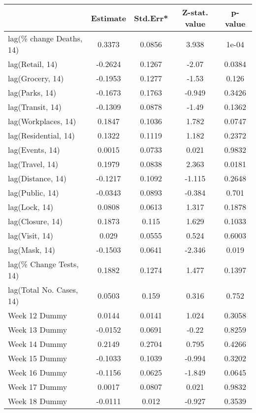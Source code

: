 \begingroup\tiny
\begin{longtable}{lcccc}
  \toprule
 & Estimate & Std.Err* & Z-stat. value & p-value \\ 
  \midrule
lag(\% change Deaths, 14) & 0.3373 & 0.0856 & 3.938 & 1e-04 \\ 
  lag(Retail, 14) & -0.2624 & 0.1267 & -2.07 & 0.0384 \\ 
  lag(Grocery, 14) & -0.1953 & 0.1277 & -1.53 & 0.126 \\ 
  lag(Parks, 14) & -0.1673 & 0.1763 & -0.949 & 0.3426 \\ 
  lag(Transit, 14) & -0.1309 & 0.0878 & -1.49 & 0.1362 \\ 
  lag(Workplaces, 14) & 0.1847 & 0.1036 & 1.782 & 0.0747 \\ 
  lag(Residential, 14) & 0.1322 & 0.1119 & 1.182 & 0.2372 \\ 
  lag(Events, 14) & 0.0015 & 0.0733 & 0.021 & 0.9832 \\ 
  lag(Travel, 14) & 0.1979 & 0.0838 & 2.363 & 0.0181 \\ 
  lag(Distance, 14) & -0.1217 & 0.1092 & -1.115 & 0.2648 \\ 
  lag(Public, 14) & -0.0343 & 0.0893 & -0.384 & 0.701 \\ 
  lag(Lock, 14) & 0.0808 & 0.0613 & 1.317 & 0.1878 \\ 
  lag(Closure, 14) & 0.1873 & 0.115 & 1.629 & 0.1033 \\ 
  lag(Visit, 14) & 0.029 & 0.0555 & 0.524 & 0.6003 \\ 
  lag(Mask, 14) & -0.1503 & 0.0641 & -2.346 & 0.019 \\ 
  lag(\% Change Tests, 14) & 0.1882 & 0.1274 & 1.477 & 0.1397 \\ 
  lag(Total No. Cases, 14) & 0.0503 & 0.159 & 0.316 & 0.752 \\ 
  Week 12 Dummy & 0.0144 & 0.0141 & 1.024 & 0.3058 \\ 
  Week 13 Dummy & -0.0152 & 0.0691 & -0.22 & 0.8259 \\ 
  Week 14 Dummy & 0.2149 & 0.2704 & 0.795 & 0.4266 \\ 
  Week 15 Dummy & -0.1033 & 0.1039 & -0.994 & 0.3202 \\ 
  Week 16 Dummy & -0.1156 & 0.0625 & -1.849 & 0.0645 \\ 
  Week 17 Dummy & 0.0017 & 0.0807 & 0.021 & 0.9832 \\ 
  Week 18 Dummy & -0.0111 & 0.012 & -0.927 & 0.3539 \\ 

\end{longtable}
